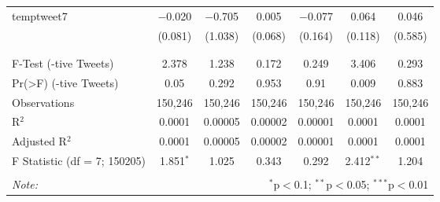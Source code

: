 \begin{table}[!htbp]
\begin{tabular}{@{\extracolsep{5pt}}lcccccc}
 temptweet7 & $-$0.020 & $-$0.705 & 0.005 & $-$0.077 & 0.064 & 0.046 \\ 
  & (0.081) & (1.038) & (0.068) & (0.164) & (0.118) & (0.585) \\ 
  & & & & & & \\ 
\hline \\[-1.8ex] 
F-Test (-tive Tweets) & 2.378 & 1.238 & 0.172 & 0.249 & 3.406 & 0.293 \\ 
Pr(>F) (-tive Tweets) & 0.05 & 0.292 & 0.953 & 0.91 & 0.009 & 0.883 \\ 
Observations & 150,246 & 150,246 & 150,246 & 150,246 & 150,246 & 150,246 \\ 
R$^{2}$ & 0.0001 & 0.00005 & 0.00002 & 0.00001 & 0.0001 & 0.0001 \\ 
Adjusted R$^{2}$ & 0.0001 & 0.00005 & 0.00002 & 0.00001 & 0.0001 & 0.0001 \\ 
F Statistic (df = 7; 150205) & 1.851$^{*}$ & 1.025 & 0.343 & 0.292 & 2.412$^{**}$ & 1.204 \\ 
\hline 
\hline \\[-1.8ex] 
\textit{Note:}  & \multicolumn{6}{r}{$^{*}$p$<$0.1; $^{**}$p$<$0.05; $^{***}$p$<$0.01} \\ 
\end{tabular} 
\end{table} 
